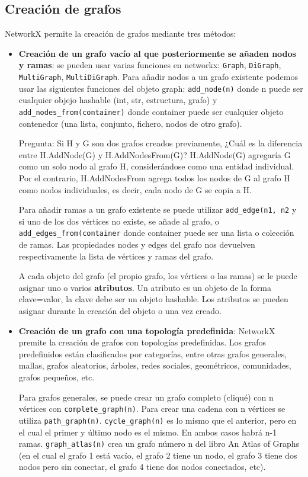 \subsection{Creación de grafos}
NetworkX permite la creación de grafos mediante tres métodos:
\begin{itemize}
\item \textbf{Creación de un grafo vacío al que posteriormente se añaden nodos y ramas}: se pueden usar varias funciones en networkx: \texttt{Graph}, \texttt{DiGraph}, \texttt{MultiGraph}, \texttt{MultiDiGraph}. Para añadir nodos a un grafo existente podemos usar las siguientes funciones del objeto graph: \texttt{add\_node(n)} donde n puede ser cualquier objejo hashable (int, str, estructura, grafo) y \texttt{add\_nodes\_from(container)} donde container puede ser cualquier objeto contenedor (una lista, conjunto, fichero, nodos de otro grafo).

Pregunta: Si H y G son dos grafos creados previamente, ¿Cuál es la diferencia entre H.AddNode(G) y H.AddNodesFrom(G)? H.AddNode(G) agregaría G como un solo nodo al grafo H, considerándose como una entidad individual. Por el contrario, H.AddNodesFrom agrega todos los nodos de G al grafo H como nodos individuales, es decir, cada nodo de G se copia a H.

Para añadir ramas a un grafo existente se puede utilizar \texttt{add\_edge(n1, n2} y si uno de los dos vértices no existe, se añade al grafo, o \texttt{add\_edges\_from(container} donde container puede ser una lista o colección de ramas. Las propiedades nodes y edges del grafo nos devuelven respectivamente la lista de vértices y ramas del grafo.

A cada objeto del grafo (el propio grafo, los vértices o las ramas) se le puede asignar uno o
varios \textbf{atributos}. Un atributo es un objeto de la forma clave=valor, la clave debe ser un objeto hashable. Los atributos se pueden asignar durante la creación del objeto o una vez creado.

\item \textbf{Creación de un grafo con una topología predefinida}: NetworkX premite la creación de grafos con topologías predefinidas. Los grafos predefinidos están clasificados por categorías, entre otras grafos generales, mallas, grafos aleatorios, árboles, redes sociales, geométricos, comunidades, grafos pequeños, etc.

Para grafos generales, se puede crear un grafo completo (cliqué) con n vértices con \texttt{complete\_graph(n)}. Para crear una cadena con n vértices se utiliza \texttt{path\_graph(n)}. \texttt{cycle\_graph(n)} es lo mismo que el anterior, pero en el cual el primer y último nodo es el mismo. En ambos casos habrá n-1 ramas. \texttt{graph\_atlas(n)} crea un grafo número n del libro An Atlas of Graphs (en el cual el grafo 1 está vacío, el grafo 2 tiene un nodo, el grafo 3 tiene dos nodos pero sin conectar, el grafo 4 tiene dos nodos conectados, etc). 


\end{itemize}

